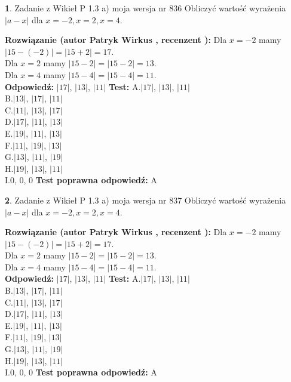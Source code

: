 \documentclass[12pt, a4paper]{article}
\theoremstyle{definition} %
\newtheorem{zad}{}
\newcommand{\zadStart}[1]{\begin{zad}#1\newline}
\newcommand{\zadStop}{\end{zad}}
\newcommand{\rozwStart}[2]{\noindent \textbf{Rozwiązanie (autor #1 , recenzent #2): }\newline}
\newcommand{\rozwStop}{\newline}
\newcommand{\odpStart}{\noindent \textbf{Odpowiedź:}\newline}
\newcommand{\odpStop}{\newline}
\newcommand{\testStart}{\noindent \textbf{Test:}\newline}
\newcommand{\testStop}{\newline}
\newcommand{\kluczStart}{\noindent \textbf{Test poprawna odpowiedź:}\newline}
\newcommand{\kluczStop}{\newline}
\begin{document}
\zadStart{Zadanie z Wikieł P 1.3 a) moja wersja nr 836}
Obliczyć wartość wyrażenia $|a - x|$ dla $x=-2,x=2,x=4$.
\zadStop
\rozwStart{Patryk Wirkus}{}
Dla $x = -2$ mamy $|15 - (-2)| = |15 + 2| = 17$.\\
Dla $x = 2$ mamy $|15 - 2| = |15 - 2| = 13$.\\
Dla $x = 4$ mamy $|15 - 4| = |15 - 4| = 11$.\\
\rozwStop
\odpStart
$|17|$, $|13|$, $|11|$
\odpStop
\testStart
A.$|17|$, $|13|$, $|11|$\\
B.$|13|$, $|17|$, $|11|$\\
C.$|11|$, $|13|$, $|17|$\\
D.$|17|$, $|11|$, $|13|$\\
E.$|19|$, $|11|$, $|13|$\\
F.$|11|$, $|19|$, $|13|$\\
G.$|13|$, $|11|$, $|19|$\\
H.$|19|$, $|13|$, $|11|$\\
I.$0$, $0$, $0$
\testStop
\kluczStart
A
\kluczStop



\zadStart{Zadanie z Wikieł P 1.3 a) moja wersja nr 837}
Obliczyć wartość wyrażenia $|a - x|$ dla $x=-2,x=2,x=4$.
\zadStop
\rozwStart{Patryk Wirkus}{}
Dla $x = -2$ mamy $|15 - (-2)| = |15 + 2| = 17$.\\
Dla $x = 2$ mamy $|15 - 2| = |15 - 2| = 13$.\\
Dla $x = 4$ mamy $|15 - 4| = |15 - 4| = 11$.\\
\rozwStop
\odpStart
$|17|$, $|13|$, $|11|$
\odpStop
\testStart
A.$|17|$, $|13|$, $|11|$\\
B.$|13|$, $|17|$, $|11|$\\
C.$|11|$, $|13|$, $|17|$\\
D.$|17|$, $|11|$, $|13|$\\
E.$|19|$, $|11|$, $|13|$\\
F.$|11|$, $|19|$, $|13|$\\
G.$|13|$, $|11|$, $|19|$\\
H.$|19|$, $|13|$, $|11|$\\
I.$0$, $0$, $0$
\testStop
\kluczStart
A
\kluczStop
\end{document}
